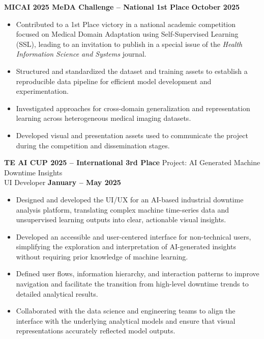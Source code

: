 \documentclass[11pt]{article}
\begin{document}
\textbf{MICAI 2025 MeDA Challenge -- National 1st Place} \hfill \textbf{October 2025}
\vspace{-0.3cm}
\begin{itemize}[leftmargin=*]
    \item Contributed to a 1st Place victory in a national academic competition focused on Medical Domain Adaptation using Self-Supervised Learning (SSL), leading to an invitation to publish in a special issue of the \textit{Health Information Science and Systems} journal.
    
    \vspace{-0.3cm}
    \item Structured and standardized the dataset and training assets to establish a reproducible data pipeline for efficient model development and experimentation.
    
    \vspace{-0.3cm}
    \item Investigated approaches for cross-domain generalization and representation learning across heterogeneous medical imaging datasets.

    \vspace{-0.3cm}
    \item Developed visual and presentation assets used to communicate the project during the competition and dissemination stages.
\end{itemize}



\textbf{TE AI CUP 2025 -- International 3rd Place} \hfill Project: AI Generated Machine Downtime Insights\\
UI Developer \hfill \textbf{January -- May 2025}
\vspace{-0.3cm}
\begin{itemize}[leftmargin=*]
    \item Designed and developed the UI/UX for an AI-based industrial downtime analysis platform, translating complex machine time-series data and unsupervised learning outputs into clear, actionable visual insights.
    
    \vspace{-0.3cm}
    \item Developed an accessible and user-centered interface for non-technical users, simplifying the exploration and interpretation of AI-generated insights without requiring prior knowledge of machine learning.
    
    \vspace{-0.3cm}
    \item Defined user flows, information hierarchy, and interaction patterns to improve navigation and facilitate the transition from high-level downtime trends to detailed analytical results.

    \vspace{-0.3cm} 
    \item Collaborated with the data science and engineering teams to align the interface with the underlying analytical models and ensure that visual representations accurately reflected model outputs.
\end{itemize}
\end{document}
